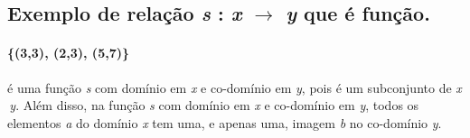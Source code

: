 \subsection{Exemplo de relação  \textit{s} : \textit{x} $\rightarrow$ \textit{y} que é função.}
	\paragraph{\{(3,3), (2,3), (5,7)\}} é uma função \textit{s} com domínio em \textit{x} e co-domínio em \textit{y}, pois é um subconjunto de \textit{x} \texttimes \,\textit{y}. Além disso, na função \textit{s} com domínio em \textit{x} e co-domínio em \textit{y}, todos os elementos \textit{a} do domínio \textit{x} tem uma, e apenas uma, imagem \textit{b }no co-domínio \textit{y}.

	

